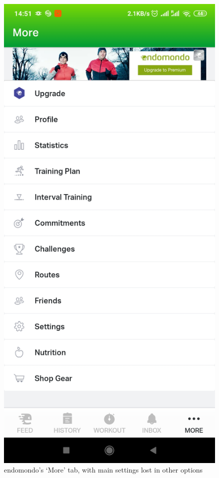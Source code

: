 \begin{figure}[h]
    \includegraphics[width=\textwidth]{Images/endomondo-more-tab.jpg}
    \caption{endomondo's `More' tab, with main settings lost in other options\cite{endomondo-more-tab}}
\end{figure}

